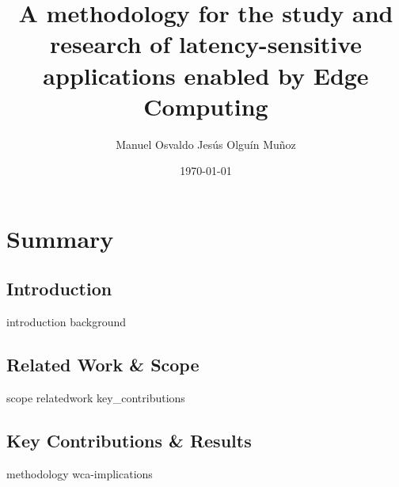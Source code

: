 \documentclass[electronic,oldfontcommands]{kthesis}
\begin{document}
\title{A methodology for the study and research of latency-sensitive applications enabled by Edge Computing}
\subtitle{{}}
\author{Manuel {Osvaldo Jesús} {Olguín Muñoz}}
\date{\today}
\address{%
	KTH Royal Institute of Technology\\%
	School of Electrical Engineering and Computer Science\\%
	Division of Information Science and Engineering\\%
	SE-10044 Stockholm\\%
	Sweden%
}

\maketitle

\frontmatter%




\clearpage%
\tableofcontents%

\mainmatter%
\glsresetall{} %
\part{Summary}\label{part:summary}
\chapter{Introduction}\label{chap:introduction}
{introduction}
{background}

\chapter{Related Work \& Scope}\label{chap:relwork}
{scope}
{relatedwork}
{key_contributions}

\chapter{Key Contributions \& Results}\label{chap:contributions}
{methodology}
{wca-implications}
\end{document}
